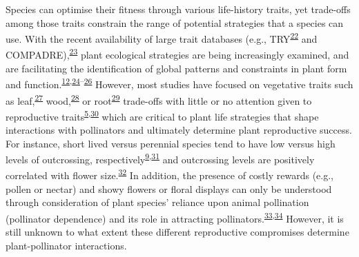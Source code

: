 \documentclass[
  12pt,
  a4paper,
]{article}
\begin{document}
Species can optimise their fitness through various life-history traits, yet trade-offs among those traits constrain the range of potential strategies that a species can use. With the recent availability of large trait databases (e.g., TRY\textsuperscript{\protect\hyperlink{ref-kattge2011}{22}} and COMPADRE),\textsuperscript{\protect\hyperlink{ref-salguero2015}{23}} plant ecological strategies are being increasingly examined, and are facilitating the identification of global patterns and constraints in plant form and function.\textsuperscript{\protect\hyperlink{ref-salguero2016}{12},\protect\hyperlink{ref-diaz2016}{24}--\protect\hyperlink{ref-carmona2021}{26}} However, most studies have focused on vegetative traits such as leaf,\textsuperscript{\protect\hyperlink{ref-wright2004}{27}} wood,\textsuperscript{\protect\hyperlink{ref-chave2009}{28}} or root\textsuperscript{\protect\hyperlink{ref-laughlin2021}{29}} trade-offs with little or no attention given to reproductive traits\textsuperscript{\protect\hyperlink{ref-roddy2021}{5},\protect\hyperlink{ref-evojtko2020}{30}} which are critical to plant life strategies that shape interactions with pollinators and ultimately determine plant reproductive success. For instance, short lived versus perennial species tend to have low versus high levels of outcrossing, respectively\textsuperscript{\protect\hyperlink{ref-moeller2017}{9},\protect\hyperlink{ref-barrett2003}{31}} and outcrossing levels are positively correlated with flower size.\textsuperscript{\protect\hyperlink{ref-goodwillie2010}{32}} In addition, the presence of costly rewards (e.g., pollen or nectar) and showy flowers or floral displays can only be understood through consideration of plant species' reliance upon animal pollination (pollinator dependence) and its role in attracting pollinators.\textsuperscript{\protect\hyperlink{ref-ollerton2011}{33},\protect\hyperlink{ref-rodger2021}{34}} However, it is still unknown to what extent these different reproductive compromises determine plant-pollinator interactions.
\end{document}

